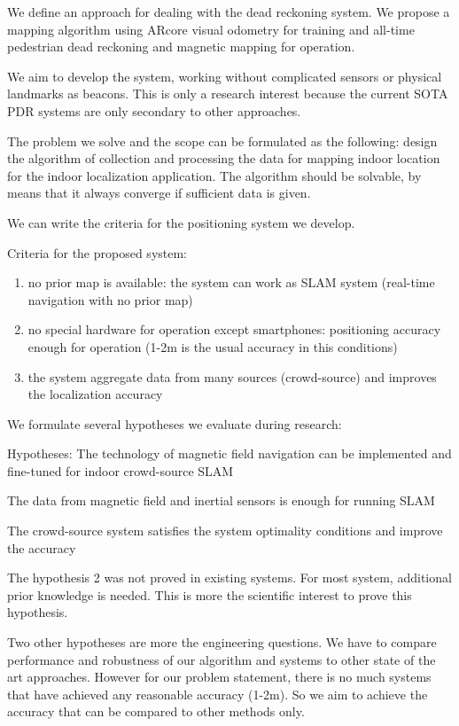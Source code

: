 \documentclass[a4paper, 12pt]{article}
\begin{document}
We define an approach for dealing with the dead reckoning system. We propose a mapping algorithm using ARcore visual odometry for training and all-time pedestrian dead reckoning and magnetic mapping for operation.

We aim to develop the system, working without complicated sensors or physical landmarks as beacons. This is only a research interest because the current SOTA PDR systems are only secondary to other approaches.

The problem we solve and the scope can be formulated as the following: design the algorithm of collection and processing the data for mapping indoor location for the indoor localization application. The algorithm should be solvable, by means that it always converge if sufficient data is given.


We can write the criteria for the positioning system we develop.

Criteria for the proposed system:
\begin{enumerate}
	\item no prior map is available: the system can work as SLAM system (real-time navigation with no prior map)
	\item no special hardware for operation except smartphones: positioning accuracy enough for operation (1-2m is the usual accuracy in this conditions)
	\item the system aggregate data from many sources (crowd-source) and improves the localization accuracy
\end{enumerate}


We formulate several hypotheses we evaluate during research:

Hypotheses:
The technology of magnetic field navigation can be implemented and fine-tuned for indoor crowd-source SLAM

The data from magnetic field and inertial sensors is enough for running SLAM

The crowd-source system satisfies the system optimality conditions and improve the accuracy

The hypothesis 2 was not proved in existing systems. For most system, additional prior knowledge is needed. This is more the scientific interest to prove this hypothesis.

Two other hypotheses are more the engineering questions. We have to compare performance and robustness of our algorithm and systems to other state of the art approaches. However for our problem statement, there is no much systems that have achieved any reasonable accuracy (1-2m). So we aim to achieve the accuracy that can be compared to other methods only.
\end{document}
